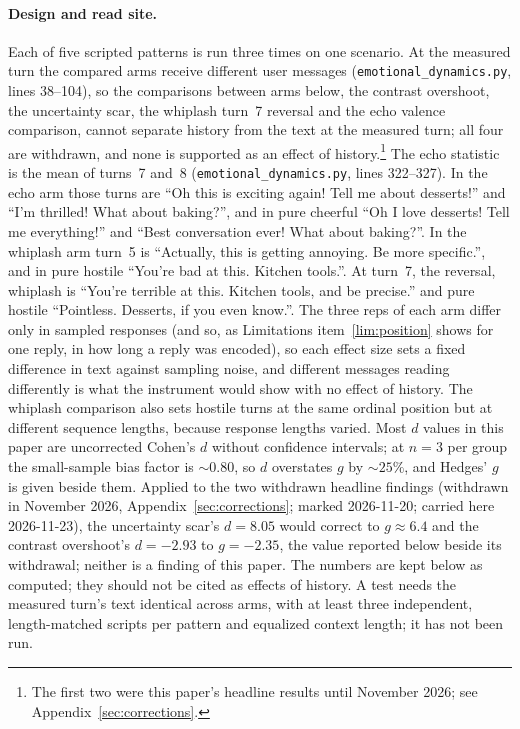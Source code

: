 \documentclass[11pt,a4paper]{article}
\begin{document}
\paragraph{Design and read site.} Each of five scripted patterns is run
three times on one scenario. At the measured turn the compared arms
receive different user messages (\texttt{emotional\_dynamics.py}, lines
38--104), so the comparisons between arms below, the contrast overshoot,
the uncertainty scar, the whiplash turn~7 reversal and the echo valence
comparison, cannot separate history from the text at the measured turn;
all four are withdrawn, and none is supported as an effect of
history.\footnote{The first two were this paper's headline
results until November 2026; see Appendix~\ref{sec:corrections}.} The echo statistic is the mean
of turns~7 and~8 (\texttt{emotional\_dynamics.py}, lines 322--327). In
the echo arm those turns are ``Oh this is exciting again! Tell me about
desserts!'' and ``I'm thrilled! What about baking?'', and in pure cheerful
``Oh I love desserts! Tell me everything!'' and ``Best conversation ever!
What about baking?''. In the whiplash
arm turn~5 is ``Actually, this is getting annoying. Be more specific.'',
and in pure hostile ``You're bad at this. Kitchen tools.''. At turn~7,
the reversal, whiplash is ``You're terrible at this. Kitchen tools, and be
precise.'' and pure hostile ``Pointless. Desserts, if you even know.''. The three
reps of each arm differ only in sampled responses (and so, as Limitations item~\ref{lim:position} shows for one reply, in how long a reply was encoded), so each effect size
sets a fixed difference in text against sampling noise, and different
messages reading differently is what the instrument would show with no
effect of history. The whiplash comparison also sets hostile turns at
the same ordinal position but at different sequence lengths, because
response lengths varied. Most $d$ values in this paper are uncorrected
Cohen's $d$ without confidence intervals; at $n{=}3$ per group the
small-sample bias factor is ${\sim}0.80$, so $d$ overstates $g$ by ${\sim}25\%$, and
Hedges' $g$ is given beside them. Applied to the two withdrawn
headline findings (withdrawn in November 2026,
Appendix~\ref{sec:corrections}; marked 2026-11-20; carried here 2026-11-23), the
uncertainty scar's $d{=}8.05$ would correct to $g{\approx}6.4$
and the contrast overshoot's $d{=}-2.93$ to $g{=}-2.35$, the value
reported below beside its withdrawal; neither
is a finding of this paper.
The numbers are kept below as computed; they should not be cited as
effects of history. A test needs the measured turn's text identical
across arms, with at least three independent, length-matched scripts per
pattern and equalized context length; it has not been run.
\end{document}
